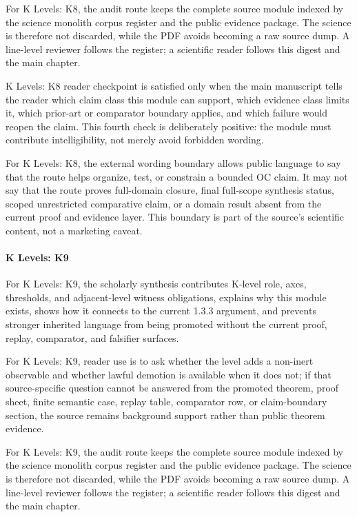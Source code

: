 For K Levels: K8, the audit route keeps the complete source module indexed by the science monolith corpus register and the public evidence package. The science is therefore not discarded, while the PDF avoids becoming a raw source dump. A line-level reviewer follows the register; a scientific reader follows this digest and the main chapter.


K Levels: K8 reader checkpoint is satisfied only when the main manuscript tells the reader which claim class this module can support, which evidence class limits it, which prior-art or comparator boundary applies, and which failure would reopen the claim. This fourth check is deliberately positive: the module must contribute intelligibility, not merely avoid forbidden wording.


For K Levels: K8, the external wording boundary allows public language to say that the route helps organize, test, or constrain a bounded OC claim. It may not say that the route proves full-domain closure, final full-scope synthesis status, scoped unrestricted comparative claim, or a domain result absent from the current proof and evidence layer. This boundary is part of the source's scientific content, not a marketing caveat.


\paragraph{K Levels: K9}

For K Levels: K9, the scholarly synthesis contributes K-level role, axes, thresholds, and adjacent-level witness obligations, explains why this module exists, shows how it connects to the current 1.3.3 argument, and prevents stronger inherited language from being promoted without the current proof, replay, comparator, and falsifier surfaces.


For K Levels: K9, reader use is to ask whether the level adds a non-inert observable and whether lawful demotion is available when it does not; if that source-specific question cannot be answered from the promoted theorem, proof sheet, finite semantic case, replay table, comparator row, or claim-boundary section, the source remains background support rather than public theorem evidence.


For K Levels: K9, the audit route keeps the complete source module indexed by the science monolith corpus register and the public evidence package. The science is therefore not discarded, while the PDF avoids becoming a raw source dump. A line-level reviewer follows the register; a scientific reader follows this digest and the main chapter.


